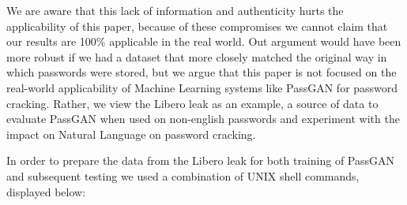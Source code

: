 We are aware that this lack of information and authenticity hurts the applicability of this paper, because of these compromises we cannot claim that our results are 100\% applicable in the real world. Out argument would have been more robust if we had a dataset that more closely matched the original way in which passwords were stored, but we argue that this paper is not focused on the real-world applicability of Machine Learning systems like PassGAN for password cracking. 
Rather, we view the Libero leak as an example, a source of data to evaluate PassGAN when used on non-english passwords and experiment with the impact on Natural Language on password cracking.

\newpage
In order to prepare the data from the Libero leak for both training of PassGAN and subsequent testing we used a combination of UNIX shell commands, displayed below:


